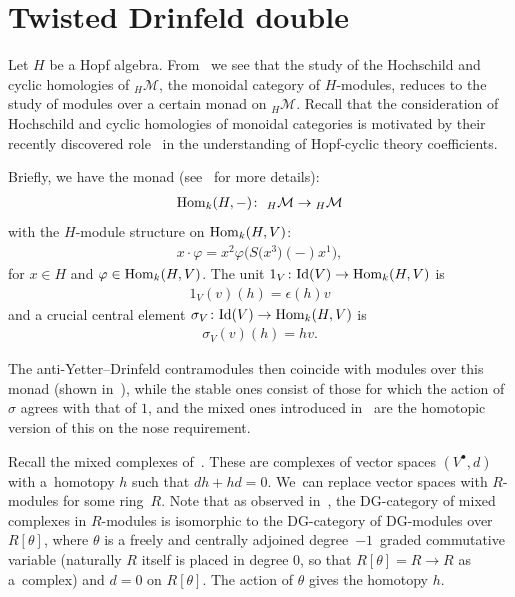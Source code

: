 \documentclass[pdftex]{sigma}
\numberwithin{equation}{section}
\newcommand{\hmod}{{_H\mathcal{M}}}
\begin{document}
\section{Twisted Drinfeld double}
Let $H$ be a Hopf algebra. From~\cite{chern} we see that the study of the Hochschild and cyclic homologies of $\hmod$, the monoidal category of $H$-modules, reduces to the study of modules over a certain monad on $\hmod$. Recall that the consideration of Hochschild and cyclic homologies of monoidal categories is motivated by their recently discovered role~\cite{chern} in the understanding of Hopf-cyclic theory coefficients.

Briefly, we have the monad (see~\cite{chern} for more details):
\begin{gather}\label{themonad}
\mathop{\rm Hom}\nolimits_k(H,-)\colon \ \hmod\to\hmod
\end{gather}
with the $H$-module structure on $\mathop{\rm Hom}\nolimits_k(H,V)$:
\begin{gather}
x\cdot\varphi=x^2\varphi\big(S\big(x^3\big)(-)x^1\big),
\end{gather}
for $x\in H$ and $\varphi\in \mathop{\rm Hom}\nolimits_k(H,V)$. The unit $1_V\colon {\rm Id}(V)\to \mathop{\rm Hom}\nolimits_k(H,V)$ is
\begin{gather}
1_V(v)(h)=\epsilon(h)v
\end{gather}
and a crucial central element $\sigma_V\colon {\rm Id}(V)\to \mathop{\rm Hom}\nolimits_k(H,V)$ is
\begin{gather}
\sigma_V(v)(h)=hv.
\end{gather}

The anti-Yetter--Drinfeld contramodules then coincide with modules over this monad (shown in~\cite{chern}), while the stable ones consist of those for which the action of $\sigma$ agrees with that of $1$, and the mixed ones introduced in~\cite{chern} are the homotopic version of this on the nose requirement.

Recall the mixed complexes of~\cite{kassel}. These are complexes of vector spaces $(V^\bullet,d)$ with a~homo\-topy $h$ such that $dh+hd=0$. We~can replace vector spaces with $R$-modules for some ring~$R$. Note that as observed in~\cite{kassel}, the DG-category of mixed complexes in $R$-modules is isomorphic to the DG-category of DG-modules over $R[\theta]$, where $\theta$ is a freely and centrally adjoined degree~$-1$~graded commutative variable (naturally $R$ itself is placed in degree $0$, so that $R[\theta]=R\to R$ as a~comp\-lex) and $d=0$ on $R[\theta]$. The action of $\theta$ gives the homotopy $h$.
\end{document}
